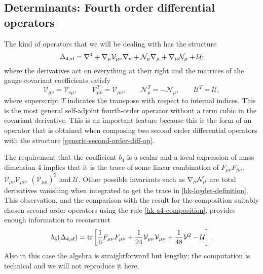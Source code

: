 \subsection{Determinants: Fourth order differential operators}



The kind of operators that we will be dealing with has the structure
\begin{equation}\label{fourt-order-self-adjoint}
\Delta_{4,\text{sf}} = { \mathcal{\nabla} }^4 + { \mathcal{\nabla} }_\mu  \mathcal{V}_{\mu\nu} { \mathcal{\nabla} }_\nu +  \mathcal{N}_\mu { \mathcal{\nabla} }_\mu + { \mathcal{\nabla} }_\mu \mathcal{N}_\mu  + \mathcal{U};
\end{equation}
where the derivatives act on everything at their right and the matrices of the gauge-covariant coefficients satisfy 
\begin{equation} \label{fourth-order-symmetry-requirement}
\mathcal{V}_{\mu\nu} = \mathcal{V}_{\nu\mu}, 
	\qquad
\mathcal{V}^T_{\mu\nu} = \mathcal{V}_{\mu\nu},
	\qquad
\mathcal{N}^T_{\mu} = - \mathcal{N}_{\mu},
	\qquad
\mathcal{U}^T = \mathcal{U},
\end{equation}
where superscript \( T \) indicates the transpose with respect to internal indices.
This is the most general self-adjoint fourth-order operator without a term cubic in the covariant derivative. This is an important feature because this is the form of an operator that is obtained when composing two second order differential operators with the structure \eqref{generic-second-order-diff-op}.


The requirement that the coefficient $b_4$ is a scalar and a local expression of mass dimension $4$ implies that it is the trace of some linear combination of \( F_{\mu\nu}F_{\mu\nu} \), \(  \mathcal{V}_{\mu\nu} \mathcal{V}_{\mu\nu} \), \( ( \mathcal{V}_{\mu\mu} )^2 \) and $\mathcal{U}$. Other possible invariants such as  \( { \mathcal{\nabla} }_\mu \mathcal{N}_\mu \) are total derivatives vanishing when integrated to get the trace in \eqref{hk-logdet-definition}. 
This observation, and the comparison with the result for the composition suitably chosen second order operators using the rule \eqref{hk-a4-composition}, provides enough information to reconstruct
\begin{equation}
b_4(\Delta_{4,\text{sf}}) = \operatorname{tr} \left[
	  \frac{1}{6} F_{\mu\nu}F_{\mu\nu}  
	+ \frac{1}{24}\mathcal V_{\mu\nu} \mathcal V_{\mu\nu}  
	+ \frac{1}{48} \mathcal V^2 
	- \mathcal U 
	\right].
\end{equation}
Also in this case the algebra is straightforward but lengthy; the computation is technical and we will not reproduce it here. 




